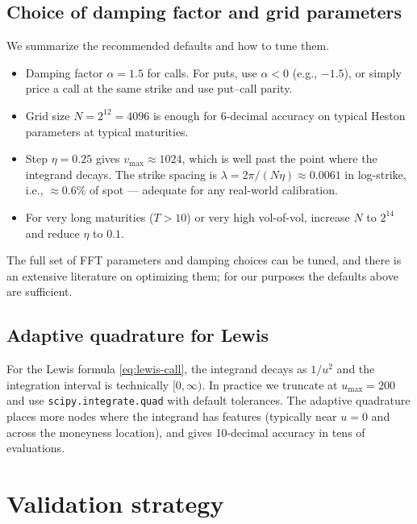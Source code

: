 \documentclass[11pt]{article}
\theoremstyle{plain}
\theoremstyle{definition}
\theoremstyle{remark}
\begin{document}
\subsection{Choice of damping factor and grid parameters}

We summarize the recommended defaults and how to tune them.

\begin{itemize}[topsep=2pt]
    \item Damping factor \(\alpha = 1.5\) for calls. For puts, use \(\alpha < 0\) (e.g., \(-1.5\)), or simply price a call at the same strike and use put--call parity.
    \item Grid size \(N = 2^{12} = 4096\) is enough for 6-decimal accuracy on typical Heston parameters at typical maturities.
    \item Step \(\eta = 0.25\) gives \(v_{\max} \approx 1024\), which is well past the point where the integrand decays. The strike spacing is \(\lambda = 2\pi/(N\eta) \approx 0.0061\) in log-strike, i.e., \(\approx 0.6\%\) of spot --- adequate for any real-world calibration.
    \item For very long maturities (\(T > 10\)) or very high vol-of-vol, increase \(N\) to \(2^{14}\) and reduce \(\eta\) to \(0.1\).
\end{itemize}

The full set of FFT parameters and damping choices can be tuned, and there is an extensive literature on optimizing them; for our purposes the defaults above are sufficient.

\subsection{Adaptive quadrature for Lewis}

For the Lewis formula \eqref{eq:lewis-call}, the integrand decays as \(1/u^2\) and the integration interval is technically \([0, \infty)\). In practice we truncate at \(u_{\max} = 200\) and use \texttt{scipy.integrate.quad} with default tolerances. The adaptive quadrature places more nodes where the integrand has features (typically near \(u = 0\) and across the moneyness location), and gives 10-decimal accuracy in tens of evaluations.

\section{Validation strategy}
\end{document}
